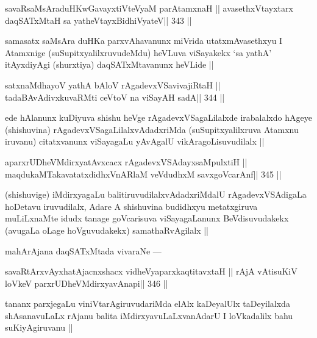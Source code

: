 \begin{shl}
savaRsaMsAraduHKwGavayxtiVteVyaM parA\s\s tamxnaH ||
avasethxVtayxtarx daqSATxMtaH sa yatheVtayxBidhiVyateV\hfill || 343 ||
\end{shl}

\begin{artha}
samasatx saMsAra duHKa parxvAhavanunx miVrida utatxmAvasethxyu I 
Atamxnige (suSupitxyalilxruvudeMdu) heVLuva viSayakekx `sa yathA' itAyxdiyAgi (shurxtiya) daqSATxMtavanunx heVLide ||
\end{artha}

\begin{shl}
satxnaMdhayoV yathA bAloV rAgadevxVSavivajiRtaH ||
tadaBAvAdivxkuvaRMti ceVtoV na viSayAH sadA\hfill || 344 ||
\end{shl}

\begin{artha}
ede hAlanunx kuDiyuva shishu heVge rAgadevxVSagaLilalxde irabalalxdo hAgeye (shishuvina) rAgadevxVSagaLilalxvAdadxriMda (suSupitxyalilxruva Atamxnu iruvanu) citatxvanunx viSayagaLu yAvAgalU vikAragoLisuvudilalx ||
\end{artha}

\begin{shl}
aparxrUDheVMdirxyatAvxcacx rAgadevxVSAdayxsaMpulxtiH ||
maqdukaMTakavatatxdidhxVnARlaM veVdudhxM savxgoVcarAnf\hfill || 345 ||
\end{shl}

\begin{artha}
(shishuvige) iMdirxyagaLu balitiruvudilalxvAdadxriMdalU rAgadevxVSAdigaLa hoDetavu iruvudilalx, Adare A shishuvina budidhxyu metatxgiruva muLiLxnaMte idudx tanage goVcarisuva viSayagaLanunx BeVdisuvudakekx (avugaLa oLage hoVguvudakekx) samathaRvAgilalx ||
\end{artha}

\begin{artha}
mahArAjana daqSATxMtada vivaraNe ---
\end{artha}

\begin{shl}
savaRtArxvAyxhatAjacnxshacx vidheVyaparxkaqtitavxtaH ||
rAjA vA\s tisuKiV loVkeV parxrUDheVMdirxyavAnapi\hfill || 346 ||
\end{shl}

\begin{artha}
tananx parxjegaLu viniVtarAgiruvudariMda elAlx kaDeyalUlx taDeyilalxda shAsanavuLaLx rAjanu balita iMdirxyavuLaLxvanAdarU I loVkadalilx bahu suKiyAgiruvanu ||
\end{artha}

